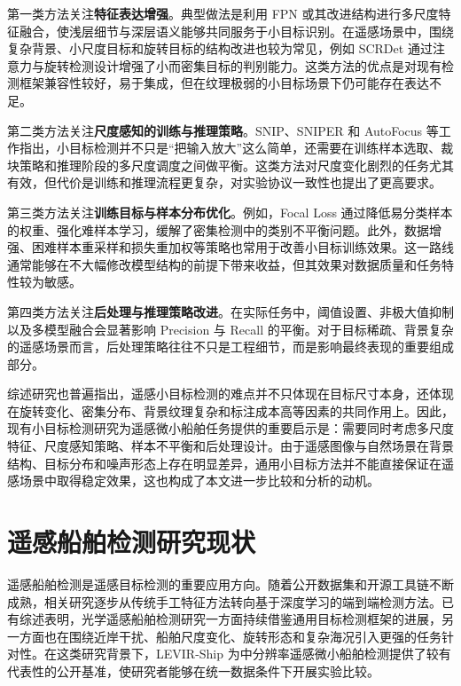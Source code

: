 第一类方法关注\textbf{特征表达增强}。典型做法是利用 FPN 或其改进结构进行多尺度特征融合，使浅层细节与深层语义能够共同服务于小目标识别\cite{lin2017_fpn}。在遥感场景中，围绕复杂背景、小尺度目标和旋转目标的结构改进也较为常见，例如 SCRDet 通过注意力与旋转检测设计增强了小而密集目标的判别能力\cite{yang2019_scrdet}。这类方法的优点是对现有检测框架兼容性较好，易于集成，但在纹理极弱的小目标场景下仍可能存在表达不足。

第二类方法关注\textbf{尺度感知的训练与推理策略}。SNIP、SNIPER 和 AutoFocus 等工作指出，小目标检测并不只是“把输入放大”这么简单，还需要在训练样本选取、裁块策略和推理阶段的多尺度调度之间做平衡\cite{singh2018_snip,singh2018_sniper,najibi2019_autofocus}。这类方法对尺度变化剧烈的任务尤其有效，但代价是训练和推理流程更复杂，对实验协议一致性也提出了更高要求。

第三类方法关注\textbf{训练目标与样本分布优化}。例如，Focal Loss 通过降低易分类样本的权重、强化难样本学习，缓解了密集检测中的类别不平衡问题\cite{lin2017_focalloss}。此外，数据增强、困难样本重采样和损失重加权等策略也常用于改善小目标训练效果。这一路线通常能够在不大幅修改模型结构的前提下带来收益，但其效果对数据质量和任务特性较为敏感。

第四类方法关注\textbf{后处理与推理策略改进}。在实际任务中，阈值设置、非极大值抑制以及多模型融合会显著影响 Precision 与 Recall 的平衡。对于目标稀疏、背景复杂的遥感场景而言，后处理策略往往不只是工程细节，而是影响最终表现的重要组成部分。

综述研究也普遍指出，遥感小目标检测的难点并不只体现在目标尺寸本身，还体现在旋转变化、密集分布、背景纹理复杂和标注成本高等因素的共同作用上\cite{wang2023_sod_review}。因此，现有小目标检测研究为遥感微小船舶任务提供的重要启示是：需要同时考虑多尺度特征、尺度感知策略、样本不平衡和后处理设计。由于遥感图像与自然场景在背景结构、目标分布和噪声形态上存在明显差异，通用小目标方法并不能直接保证在遥感场景中取得稳定效果，这也构成了本文进一步比较和分析的动机。

\section{遥感船舶检测研究现状}

遥感船舶检测是遥感目标检测的重要应用方向。随着公开数据集和开源工具链不断成熟，相关研究逐步从传统手工特征方法转向基于深度学习的端到端检测方法。已有综述表明，光学遥感船舶检测研究一方面持续借鉴通用目标检测框架的进展，另一方面也在围绕近岸干扰、船舶尺度变化、旋转形态和复杂海况引入更强的任务针对性\cite{zhao2024_shipsurvey}。在这类研究背景下，LEVIR-Ship 为中分辨率遥感微小船舶检测提供了较有代表性的公开基准，使研究者能够在统一数据条件下开展实验比较\cite{chen2022_tinyship_drenet}。

